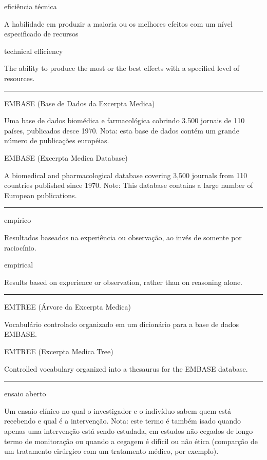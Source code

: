 \documentclass[
]{book}
\begin{document}
eficiência técnica

A habilidade em produzir a maioria ou os melhores efeitos com um nível especificado de recursos

technical efficiency

The ability to produce the most or the best effects with a specified level of resources.

\begin{center}\rule{0.5\linewidth}{0.5pt}\end{center}

EMBASE (Base de Dados da Excerpta Medica)

Uma base de dados biomédica e farmacológica cobrindo 3.500 jornais de 110 países, publicados desce 1970. Nota: esta base de dados contém um grande número de publicações européias.

EMBASE (Excerpta Medica Database)

A biomedical and pharmacological database covering 3,500 journals from 110 countries published since 1970. Note: This database contains a large number of European publications.

\begin{center}\rule{0.5\linewidth}{0.5pt}\end{center}

empírico

Resultados baseados na experiência ou observação, ao invés de somente por raciocínio.

empirical

Results based on experience or observation, rather than on reasoning alone.

\begin{center}\rule{0.5\linewidth}{0.5pt}\end{center}

EMTREE (Árvore da Excerpta Medica)

Vocabulário controlado organizado em um dicionário para a base de dados EMBASE.

EMTREE (Excerpta Medica Tree)

Controlled vocabulary organized into a thesaurus for the EMBASE database.

\begin{center}\rule{0.5\linewidth}{0.5pt}\end{center}

ensaio aberto

Um ensaio clínico no qual o investigador e o indivíduo sabem quem está recebendo e qual é a intervenção. Nota: este termo é também isado quando apenas uma intervenção está sendo estudada, em estudos não cegados de longo termo de monitoração ou quando a cegagem é difícil ou não ética (comparção de um tratamento cirúrgico com um tratamento médico, por exemplo).
\end{document}
